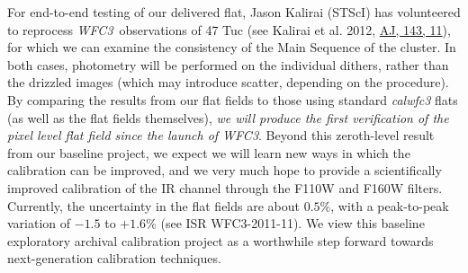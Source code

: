 \documentclass[12pt]{article}
\newcommand{\project}[1]{\textsl{#1}}
\newcommand{\WFC}{\project{WFC3}}
\begin{document}
For end-to-end testing of our delivered flat, Jason
Kalirai (STScI) has volunteered to reprocess \WFC\ observations of 47 Tuc (see
Kalirai et al. 2012, \href{http://dx.doi.org/10.1088/0004-6256/143/1/11}{AJ, 143, 11}),
for which we can examine the
consistency of the Main Sequence of the cluster.  In both cases,
photometry will be performed on the individual dithers, rather than
the drizzled images (which may introduce scatter, depending on the
procedure).  By comparing the results from our flat fields to those
using standard \emph{calwfc3} flats (as well as the flat fields
themselves), \emph{we will produce the first verification of the pixel
  level flat field since the launch of \WFC}.  Beyond this zeroth-level
result from our baseline project, we expect we will learn new ways in
which the calibration can be improved, and we very much hope to provide a scientifically
improved calibration of the IR channel through the F110W and F160W filters.  Currently, the
uncertainty in the flat fields are about $0.5\%$, with a peak-to-peak
variation of $-1.5$ to $+1.6\%$ (see ISR WFC3-2011-11).  We view this
baseline exploratory archival calibration project as a worthwhile step forward
towards next-generation calibration techniques.
\end{document}
